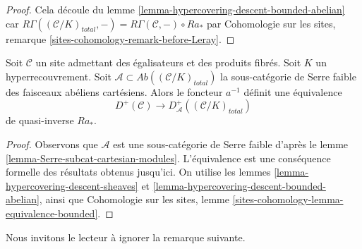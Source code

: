 \begin{proof}
Cela découle du lemme \ref{lemma-hypercovering-descent-bounded-abelian}
car $R\Gamma((\mathcal{C}/K)_{total}, -) =
R\Gamma(\mathcal{C}, -) \circ Ra_*$ par
Cohomologie sur les sites, remarque \ref{sites-cohomology-remark-before-Leray}.
\end{proof}

\begin{lemma}
\label{lemma-hypercovering-equivalence-bounded}
Soit $\mathcal{C}$ un site admettant des égalisateurs et des produits fibrés.
Soit $K$ un hyperrecouvrement.
Soit $\mathcal{A} \subset \textit{Ab}((\mathcal{C}/K)_{total})$
la sous-catégorie de Serre faible des faisceaux abéliens cartésiens.
Alors le foncteur $a^{-1}$ définit une équivalence
$$
D^+(\mathcal{C}) \longrightarrow D_\mathcal{A}^+((\mathcal{C}/K)_{total})
$$
de quasi-inverse $Ra_*$.
\end{lemma}

\begin{proof}
Observons que $\mathcal{A}$ est une sous-catégorie de Serre faible d'après
le lemme \ref{lemma-Serre-subcat-cartesian-modules}.
L'équivalence est une conséquence formelle des
résultats obtenus jusqu'ici. On utilise les lemmes
\ref{lemma-hypercovering-descent-sheaves} et
\ref{lemma-hypercovering-descent-bounded-abelian}, ainsi que
Cohomologie sur les sites, lemme \ref{sites-cohomology-lemma-equivalence-bounded}.
\end{proof}

\noindent
Nous invitons le lecteur à ignorer la remarque suivante.

